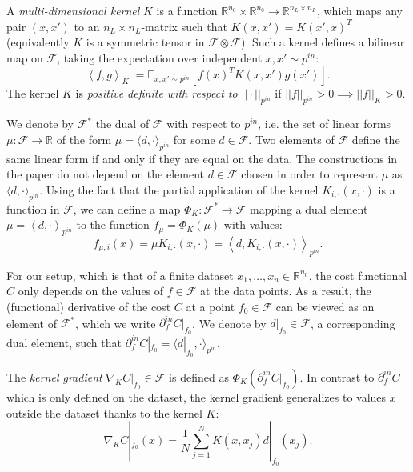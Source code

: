 A \emph{multi-dimensional kernel}  $K$ is a function $\mathbb{R}^{n_{0}}\times\mathbb{R}^{n_{0}}\to\mathbb{R}^{n_{L}\times n_{L}}$, which maps any pair $(x,x')$ to an $n_{L}\times n_{L}$-matrix such that $K(x, x') = K(x', x)^T$ (equivalently $K$ is a symmetric tensor in $\mathcal{F}\otimes\mathcal{F}$). Such a kernel defines a bilinear map on $\mathcal{F}$, taking the expectation over independent $x, x' \sim p^{in}$: $$
\left<f, g \right>_K := \mathbb{E}_{x, x' \sim p^{in}} \left[f(x)^T K(x, x') g(x') \right].
$$
The kernel $K$ is \emph{positive definite with respect to  $|| \cdot ||_{p^{in}} $}  if $ || f ||_{p^{in}} > 0 \implies || f ||_K > 0$.

We denote by $ \mathcal{F}^{*} $ the dual of $ \mathcal{F} $ with respect to $ p^{in} $, i.e. the set of linear forms $ \mu: \mathcal {F} \to \mathbb{R} $ of the form $ \mu = \langle d, \cdot \rangle_{p^{in}} $ for some $ d \in \mathcal{F} $.  Two elements of $\mathcal{F}$ define the same linear form if and only if they are equal on the data. The constructions in the paper do not depend on the element $d \in \mathcal{F}$ chosen in order to represent $ \mu$ as $\langle d, \cdot \rangle_{p^{in}}$. Using the fact that the partial application of the kernel $K_{i, \cdot}(x, \cdot)$ is a function in $\mathcal{F}$, we can define a map $\Phi_K : \mathcal{F}^* \to \mathcal{F}$ mapping a dual element $\mu = \left<d, \cdot\right>_{p^{in}}$ to the function $f_\mu = \Phi_K(\mu)$ with values: $$
f_{\mu, i}(x) = \mu K_{i, \cdot}(x, \cdot) =  \left< d, K_{i, \cdot}(x, \cdot) \right>_{p^{in}}.
$$

For our setup, which is that of a finite dataset $ x_1, \ldots, x_n \in \mathbb{R}^{n_0} $, the cost functional $ C $ only depends on the values of $ f \in \mathcal{F} $ at the data points. As a result, the (functional) derivative of the cost $ C $ at a point $f_0\in\mathcal{F}$ can be viewed as an element of $ \mathcal{F}^{*} $, which we write $ \partial_f^{in} C |_{f_0} $. We denote by  $ d |_{f_0} \in \mathcal{F} $, a corresponding dual element, such that $ \partial_f^{in} C|_{f_0}  = \langle d |_{f_0},  \cdot \rangle_{p^{in}} $.

The \emph{kernel gradient} $\nabla_K C|_{f_0} \in \mathcal{F}$ is defined as $\Phi_K \left( \partial_f^{in} C|_{f_0} \right) $. In contrast to $ \partial_f^{in} C $ which is only defined on the dataset,  the kernel gradient generalizes to values $x$ outside the dataset thanks to the kernel $K$: 
\[
	\nabla_K C|_{f_0} (x) = \frac{1}{N} \sum_{j=1}^{N} K(x, x_j) d|_{f_0} (x_j) .
\] 

